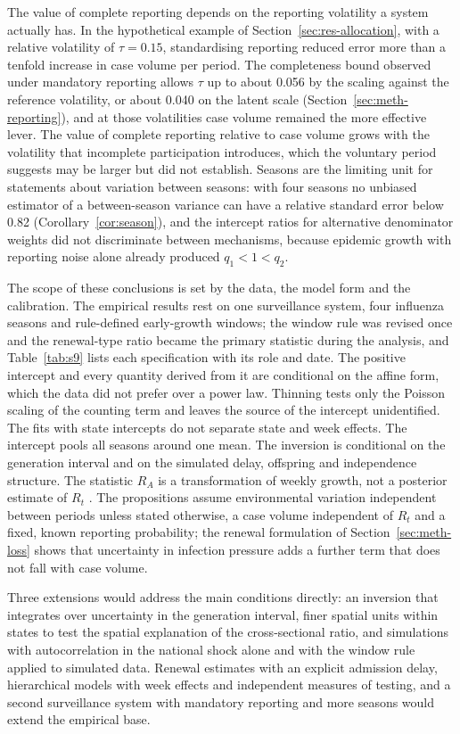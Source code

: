 The value of complete reporting depends on the reporting volatility a system actually has. In the hypothetical example of Section~\ref{sec:res-allocation}, with a relative volatility of $\tau=0.15$, standardising reporting reduced error more than a tenfold increase in case volume per period. The completeness bound observed under mandatory reporting allows $\tau$ up to about 0.056 by the scaling against the reference volatility, or about 0.040 on the latent scale (Section~\ref{sec:meth-reporting}), and at those volatilities case volume remained the more effective lever. The value of complete reporting relative to case volume grows with the volatility that incomplete participation introduces, which the voluntary period suggests may be larger but did not establish. Seasons are the limiting unit for statements about variation between seasons: with four seasons no unbiased estimator of a between-season variance can have a relative standard error below 0.82 (Corollary~\ref{cor:season}), and the intercept ratios for alternative denominator weights did not discriminate between mechanisms, because epidemic growth with reporting noise alone already produced $q_1<1<q_2$.

The scope of these conclusions is set by the data, the model form and the calibration. The empirical results rest on one surveillance system, four influenza seasons and rule-defined early-growth windows; the window rule was revised once and the renewal-type ratio became the primary statistic during the analysis, and Table~\ref{tab:s9} lists each specification with its role and date. The positive intercept and every quantity derived from it are conditional on the affine form, which the data did not prefer over a power law. Thinning tests only the Poisson scaling of the counting term and leaves the source of the intercept unidentified. The fits with state intercepts do not separate state and week effects. The intercept pools all seasons around one mean. The inversion is conditional on the generation interval and on the simulated delay, offspring and independence structure. The statistic $R_A$ is a transformation of weekly growth, not a posterior estimate of $R_t$ \citep{cori2013new}. The propositions assume environmental variation independent between periods unless stated otherwise, a case volume independent of $R_t$ and a fixed, known reporting probability; the renewal formulation of Section~\ref{sec:meth-loss} shows that uncertainty in infection pressure adds a further term that does not fall with case volume.

Three extensions would address the main conditions directly: an inversion that integrates over uncertainty in the generation interval, finer spatial units within states to test the spatial explanation of the cross-sectional ratio, and simulations with autocorrelation in the national shock alone and with the window rule applied to simulated data. Renewal estimates with an explicit admission delay, hierarchical models with week effects and independent measures of testing, and a second surveillance system with mandatory reporting and more seasons would extend the empirical base.

